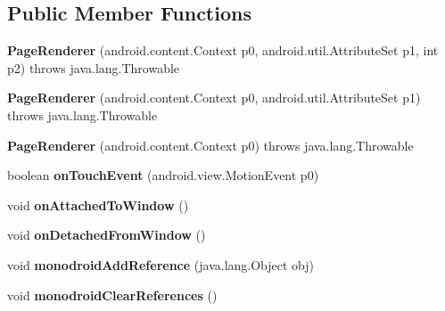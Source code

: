 \subsection*{Public Member Functions}
\begin{DoxyCompactItemize}
\item 
\mbox{\label{classmd5b60ffeb829f638581ab2bb9b1a7f4f3f_1_1PageRenderer_acb75aacbb9b00a0617d2f6d02687172b}} 
{\bfseries Page\+Renderer} (android.\+content.\+Context p0, android.\+util.\+Attribute\+Set p1, int p2)  throws java.\+lang.\+Throwable 	
\item 
\mbox{\label{classmd5b60ffeb829f638581ab2bb9b1a7f4f3f_1_1PageRenderer_a451203d230b83724610cc6a9c0ff6d27}} 
{\bfseries Page\+Renderer} (android.\+content.\+Context p0, android.\+util.\+Attribute\+Set p1)  throws java.\+lang.\+Throwable 	
\item 
\mbox{\label{classmd5b60ffeb829f638581ab2bb9b1a7f4f3f_1_1PageRenderer_afd644ee1ae548adf52a3129fc8384a4d}} 
{\bfseries Page\+Renderer} (android.\+content.\+Context p0)  throws java.\+lang.\+Throwable 	
\item 
\mbox{\label{classmd5b60ffeb829f638581ab2bb9b1a7f4f3f_1_1PageRenderer_a83a5007f3a24de66ed291c422b3b2adf}} 
boolean {\bfseries on\+Touch\+Event} (android.\+view.\+Motion\+Event p0)
\item 
\mbox{\label{classmd5b60ffeb829f638581ab2bb9b1a7f4f3f_1_1PageRenderer_a50c8e09a94fb59f2f11fa7ed1f7296e2}} 
void {\bfseries on\+Attached\+To\+Window} ()
\item 
\mbox{\label{classmd5b60ffeb829f638581ab2bb9b1a7f4f3f_1_1PageRenderer_adabdc0dbf9335603861e999017656a19}} 
void {\bfseries on\+Detached\+From\+Window} ()
\item 
\mbox{\label{classmd5b60ffeb829f638581ab2bb9b1a7f4f3f_1_1PageRenderer_a89f8e358b3bf48337c91fc57b5aa1a1e}} 
void {\bfseries monodroid\+Add\+Reference} (java.\+lang.\+Object obj)
\item 
\mbox{\label{classmd5b60ffeb829f638581ab2bb9b1a7f4f3f_1_1PageRenderer_ac993d3d981957dbc682a298a20ceda2b}} 
void {\bfseries monodroid\+Clear\+References} ()
\end{DoxyCompactItemize}
